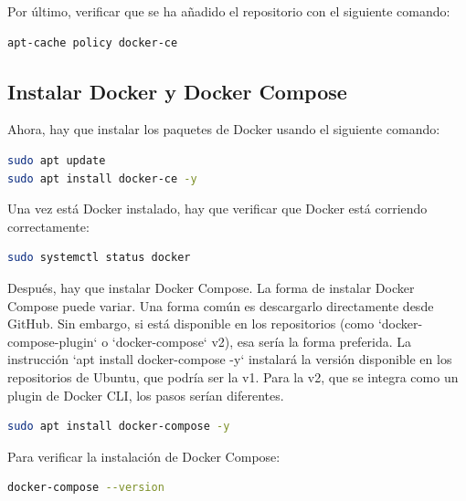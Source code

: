 Por último, verificar que se ha añadido el repositorio con el siguiente comando:
\begin{lstlisting}[language=bash]
apt-cache policy docker-ce
\end{lstlisting}

\subsection{Instalar Docker y Docker Compose}
Ahora, hay que instalar los paquetes de Docker usando el siguiente comando:
\begin{lstlisting}[language=bash]
sudo apt update
sudo apt install docker-ce -y
\end{lstlisting}

Una vez está Docker instalado, hay que verificar que Docker está corriendo correctamente:
\begin{lstlisting}[language=bash]
sudo systemctl status docker
\end{lstlisting}

Después, hay que instalar Docker Compose. La forma de instalar Docker Compose puede variar. Una forma común es descargarlo directamente desde GitHub. Sin embargo, si está disponible en los repositorios (como `docker-compose-plugin` o `docker-compose` v2), esa sería la forma preferida. La instrucción `apt install docker-compose -y` instalará la versión disponible en los repositorios de Ubuntu, que podría ser la v1. Para la v2, que se integra como un plugin de Docker CLI, los pasos serían diferentes.
\begin{lstlisting}[language=bash]
sudo apt install docker-compose -y
\end{lstlisting}
Para verificar la instalación de Docker Compose:
\begin{lstlisting}[language=bash]
docker-compose --version
\end{lstlisting}